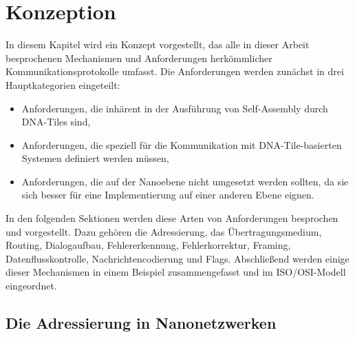 \chapter{Konzeption}
\label{cha:konzept}
In diesem Kapitel wird ein Konzept vorgestellt, das alle in dieser Arbeit besprochenen Mechanismen und Anforderungen herkömmlicher Kommunikationsprotokolle umfasst. Die Anforderungen werden zunächst in drei Hauptkategorien eingeteilt:
\begin{itemize}
\item Anforderungen, die inhärent in der Ausführung von Self-Assembly durch DNA-Tiles sind,
\item Anforderungen, die speziell für die Kommunikation mit DNA-Tile-basierten Systemen definiert werden müssen,
\item Anforderungen, die auf der Nanoebene nicht umgesetzt werden sollten, da sie sich besser für eine Implementierung auf einer anderen Ebene eignen.
\end{itemize}
In den folgenden Sektionen werden diese Arten von Anforderungen besprochen und vorgestellt. Dazu gehören die Adressierung, das Übertragungsmedium, Routing, Dialogaufbau, Fehlererkennung, Fehlerkorrektur, Framing, Datenflusskontrolle, Nachrichtencodierung und Flags. Abschließend werden einige dieser Mechanismen in einem Beispiel zusammengefasst und im ISO/OSI-Modell eingeordnet.

\section{Die Adressierung in Nanonetzwerken}

